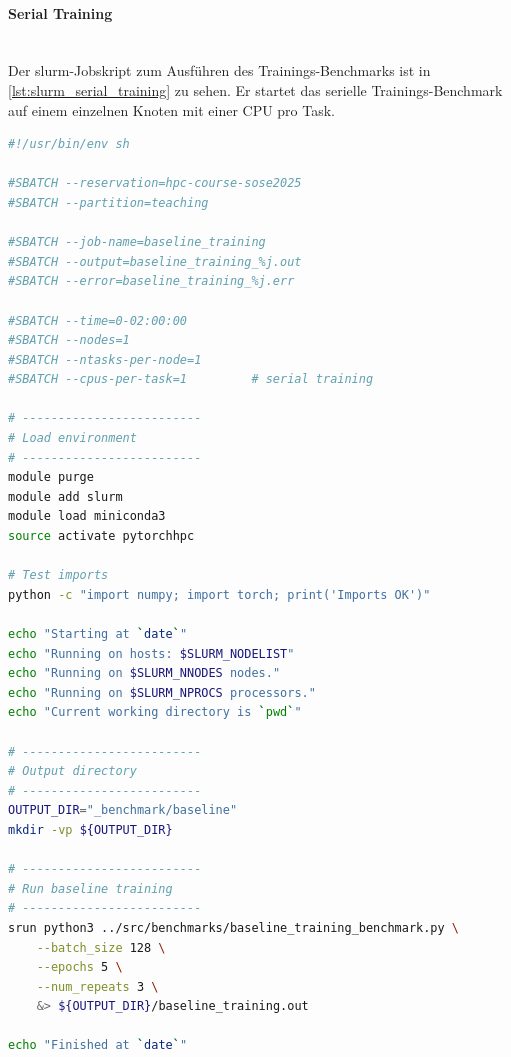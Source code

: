 \documentclass{article}
\begin{document}
\paragraph{Serial Training} \mbox{}\\
Der slurm-Jobskript zum Ausführen des Trainings-Benchmarks ist in \ref{lst:slurm_serial_training} zu sehen. Er 
startet das serielle Trainings-Benchmark auf einem einzelnen Knoten mit einer CPU pro Task. \\
\begin{lstlisting}[language=bash, caption={Slurm-Jobskript zum Ausführen des Serielles Trainingskript}, label={lst:slurm_serial_training},
basicstyle=\ttfamily\small, keywordstyle=\color{blue}\bfseries, commentstyle=\color{green!60!black}, stringstyle=\color{orange}]
#!/usr/bin/env sh

#SBATCH --reservation=hpc-course-sose2025
#SBATCH --partition=teaching

#SBATCH --job-name=baseline_training
#SBATCH --output=baseline_training_%j.out
#SBATCH --error=baseline_training_%j.err

#SBATCH --time=0-02:00:00         
#SBATCH --nodes=1
#SBATCH --ntasks-per-node=1
#SBATCH --cpus-per-task=1         # serial training

# -------------------------
# Load environment
# -------------------------
module purge
module add slurm
module load miniconda3
source activate pytorchhpc

# Test imports
python -c "import numpy; import torch; print('Imports OK')"

echo "Starting at `date`"
echo "Running on hosts: $SLURM_NODELIST"
echo "Running on $SLURM_NNODES nodes."
echo "Running on $SLURM_NPROCS processors."
echo "Current working directory is `pwd`"

# -------------------------
# Output directory
# -------------------------
OUTPUT_DIR="_benchmark/baseline"
mkdir -vp ${OUTPUT_DIR}

# -------------------------
# Run baseline training
# -------------------------
srun python3 ../src/benchmarks/baseline_training_benchmark.py \
    --batch_size 128 \
    --epochs 5 \
    --num_repeats 3 \
    &> ${OUTPUT_DIR}/baseline_training.out

echo "Finished at `date`"
\end{lstlisting}
\end{document}
